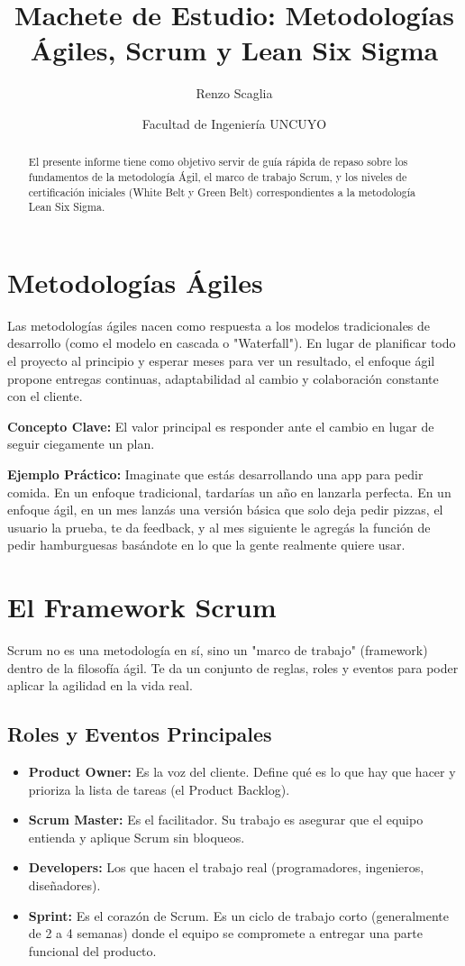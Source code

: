 \documentclass[11pt,a4paper]{article}
\title{\textbf{Machete de Estudio: Metodologías Ágiles, Scrum y Lean Six Sigma}}
\author{Renzo Scaglia}
\date{Facultad de Ingeniería UNCUYO}
\begin{document}
\maketitle

\begin{abstract}
El presente informe tiene como objetivo servir de guía rápida de repaso sobre los fundamentos de la metodología Ágil, el marco de trabajo Scrum, y los niveles de certificación iniciales (White Belt y Green Belt) correspondientes a la metodología Lean Six Sigma.
\end{abstract}

\section{Metodologías Ágiles}
Las metodologías ágiles nacen como respuesta a los modelos tradicionales de desarrollo (como el modelo en cascada o "Waterfall"). En lugar de planificar todo el proyecto al principio y esperar meses para ver un resultado, el enfoque ágil propone entregas continuas, adaptabilidad al cambio y colaboración constante con el cliente.

\textbf{Concepto Clave:} El valor principal es responder ante el cambio en lugar de seguir ciegamente un plan.

\textbf{Ejemplo Práctico:} Imaginate que estás desarrollando una app para pedir comida. En un enfoque tradicional, tardarías un año en lanzarla perfecta. En un enfoque ágil, en un mes lanzás una versión básica que solo deja pedir pizzas, el usuario la prueba, te da feedback, y al mes siguiente le agregás la función de pedir hamburguesas basándote en lo que la gente realmente quiere usar.

\section{El Framework Scrum}
Scrum no es una metodología en sí, sino un "marco de trabajo" (framework) dentro de la filosofía ágil. Te da un conjunto de reglas, roles y eventos para poder aplicar la agilidad en la vida real.

\subsection{Roles y Eventos Principales}
\begin{itemize}
    \item \textbf{Product Owner:} Es la voz del cliente. Define qué es lo que hay que hacer y prioriza la lista de tareas (el Product Backlog).
    \item \textbf{Scrum Master:} Es el facilitador. Su trabajo es asegurar que el equipo entienda y aplique Scrum sin bloqueos.
    \item \textbf{Developers:} Los que hacen el trabajo real (programadores, ingenieros, diseñadores).
    \item \textbf{Sprint:} Es el corazón de Scrum. Es un ciclo de trabajo corto (generalmente de 2 a 4 semanas) donde el equipo se compromete a entregar una parte funcional del producto.
\end{itemize}
\end{document}
